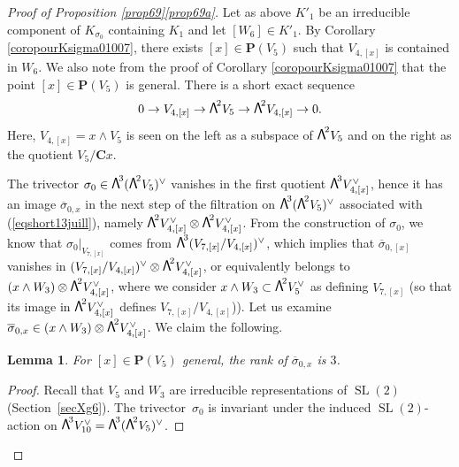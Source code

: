 \documentclass[JEP,XML,SOM,Unicode, NoEqCountersInSection,NoFloatCountersInSection]{cedram}
\newtheorem{lemm}{Lemma}[section]
\theoremstyle{definition}
\renewcommand\C{{\mathbf C}}\let\CC\C
\renewcommand\P{{\mathbf P}}\let\PP\P
\let\dual\vee
\DeclareMathOperator{\SL}{SL}
\newcommand\bw[1]{{\hbox{\large$\mathsf{\Lambda}$}^{\!#1}}}
\begin{document}
\begin{proof}[Proof of Proposition \ref{prop69}\eqref{prop69a}]
Let as above $K'_1$ be an irreducible component of $K_{\sigma_0}$ containing $K_1$ and let $[W_6]\in K'_1$. By Corollary \ref{coropourKsigma01007}, there exists
$[x]\in\P(V_5)$ such that $V_{4,[x]}$ is contained in $W_6$. We also note from the proof of
Corollary \ref{coropourKsigma01007} that the point $[x]\in\P(V_5)$ is general.
There is a short exact sequence
\begin{equation}\label{eqshort13juill}
0\to V_{4,[x]}\to \bw2V_5\to \bw2V_{4,[x]}\to 0.
\end{equation}
Here, $V_{4,[x]}=x\wedge V_5$ is seen on the left as a subspace of $ \bw2V_5$ and on the right as the quotient $V_5/\C x$.

The trivector $\sigma_0\in\bw3(\bw2V_5)^\dual$ vanishes in the first quotient $\bw3V_{4,[x]}^\dual$, hence
it has an image $\overline{\sigma}_{0,x}$ in the next step of the filtration on $\bw3(\bw2V_5)^\dual$ associated with
(\ref{eqshort13juill}), namely $\bw2V_{4,[x]}^\dual\otimes \bw2V_{4,[x]}^\dual$.
From the construction of $\sigma_0$, we know that
$\sigma_0\vert_{V_{7,[x]}}$ comes from $\bw3(V_{7,[x]}/V_{4,[x]})^\dual$, which implies that
$\overline{\sigma}_{0,[x]}$ vanishes in $(V_{7,[x]}/V_{4,[x]})^\dual\otimes \bw2V_{4,[x]}^\dual$, or equivalently belongs
to $(x\wedge W_3)\otimes \bw2V_{4,[x]}^\dual$, where we consider $x\wedge W_3\subset \bw2V_{5}^\dual$ as defining $V_{7,[x]}$ (so that its image in $\bw2V_{4,[x]}^\dual$ defines
$V_{7,[x]}/V_{4,[x]}$)).
Let us examine $\overline{\sigma}_{0,x}\in(x\wedge W_3)\otimes \bw2V_{4,[x]}^\dual$. We claim
the following.

\begin{lemm} \label{lerankdesigma0x}
For $[x]\in\P(V_5)$ general, the rank of $\overline{\sigma}_{0,x}$ is $3$.
\end{lemm}

\begin{proof} Recall that $V_5$ and $W_3$ are irreducible representations of $\SL(2)$ (Section~\ref{secXg6}). The trivector~$\sigma_0$ is invariant under the induced $\SL(2)$-action on $\bw3 V_{10}^\dual=\bw3(\bw2V_5)^\dual$.


\end{proof}
\end{proof}
\end{document}
